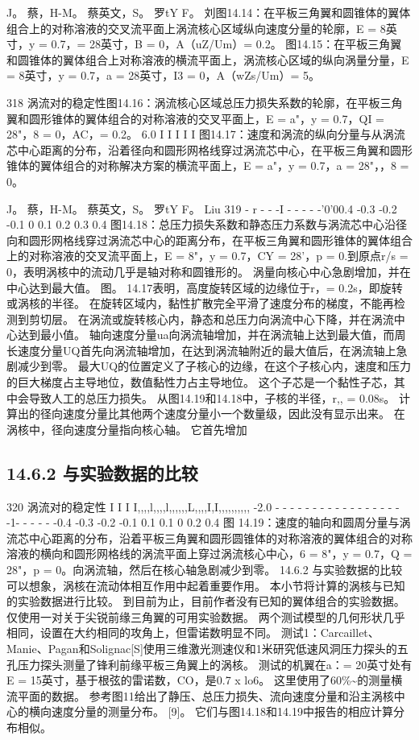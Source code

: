 \documentclass[UTF8,11pt,a4paper,openany,fontset=fandol]{ctexbook}
\begin{document}
J。 蔡，H-M。 蔡英文，S。 罗tY F。 刘图14.14：在平板三角翼和圆锥体的翼体组合上的对称溶液的交叉流平面上涡流核心区域纵向速度分量的轮廓，E = 8英寸，y = 0.7，= 28英寸，B = 0，A（uZ/Um）= 0.2。 图14.15：在平板三角翼和圆锥体的翼体组合上对称溶液的横流平面上，涡流核心区域的纵向涡量分量，E = 8英寸，y = 0.7，a = 28英寸，I3 = 0，A（wZs/Um）= 5。

318 涡流对的稳定性图14.16：涡流核心区域总压力损失系数的轮廓，在平板三角翼和圆形锥体的翼体组合的对称溶液的交叉平面上，E = a"，y = 0.7，QI = 28"，8 = 0，AC，= 0.2。 6.0 I I I I I 图14.17：速度和涡流的纵向分量与从涡流芯中心距离的分布，沿着径向和圆形网格线穿过涡流芯中心，在平板三角翼和圆形锥体的翼体组合的对称解决方案的横流平面上，E = a"，y = 0.7，a = 28"，，8 = 0。

J。 蔡，H-M。 蔡英文，S。 罗tY F。 Liu 319 - r - - -I - - - - -'0'00.4 -0.3 -0.2 -0.1 0 0.1 0.2 0.3 0.4 图14.18：总压力损失系数和静态压力系数与涡流芯中心沿径向和圆形网格线穿过涡流芯中心的距离分布，在平板三角翼和圆形锥体的翼体组合上的对称溶液的交叉流平面上，E = 8"，y = 0.7，CY = 28'，p = 0.到原点r/s = 0，表明涡核中的流动几乎是轴对称和圆锥形的。 涡量向核心中心急剧增加，并在中心达到最大值。 图。 14.17表明，高度旋转区域的边缘位于r，= 0.2s，即旋转或涡核的半径。 在旋转区域内，黏性扩散完全平滑了速度分布的梯度，不能再检测到剪切层。 在涡流或旋转核心内，静态和总压力向涡流中心下降，并在涡流中心达到最小值。 轴向速度分量ua向涡流轴增加，并在涡流轴上达到最大值，而周长速度分量UQ首先向涡流轴增加，在达到涡流轴附近的最大值后，在涡流轴上急剧减少到零。 最大UQ的位置定义了子核心的边缘，在这个子核心内，速度和压力的巨大梯度占主导地位，数值黏性力占主导地位。 这个子芯是一个黏性子芯，其中会导致人工的总压力损失。 从图14.19和14.18中，子核的半径，r,, = 0.08s。 计算出的径向速度分量比其他两个速度分量小一个数量级，因此没有显示出来。 在涡核中，径向速度分量指向核心轴。 它首先增加

\subsection{14.6.2 与实验数据的比较}
320 涡流对的稳定性 I I I I,,,,l,,,,l,,,,,,L,,,,I,I,,,,,,,,,, -2.0 - - - - - - - - - - - - - - - - - -1- - - - - -0.4 -0.3 -0.2 -0.1 0.1 0.1 0 0.2 0.4 图 14.19：速度的轴向和圆周分量与涡流芯中心距离的分布，沿着平板三角翼和圆形圆锥体的对称溶液的翼体组合的对称溶液的横向和圆形网格线的涡流平面上穿过涡流核心中心，6 = 8"，y = 0.7，Q = 28"，p = 0。向涡流轴，然后在核心轴急剧减少到零。 14.6.2 与实验数据的比较 可以想象，涡核在流动体相互作用中起着重要作用。 本小节将计算的涡核与已知的实验数据进行比较。 到目前为止，目前作者没有已知的翼体组合的实验数据。 仅使用一对关于尖锐前缘三角翼的可用实验数据。 两个测试模型的几何形状几乎相同，设置在大约相同的攻角上，但雷诺数明显不同。 测试1：Carcaillet、Manie、Pagan和Solignac[S]使用三维激光测速仪和1米研究低速风洞压力探头的五孔压力探头测量了锋利前缘平板三角翼上的涡核。 测试的机翼在a：= 20英寸处有E = 15英寸，基于根弦的雷诺数，CO，是0.7 x lo6。 这里使用了60\%\textasciitilde{}的测量横流平面的数据。 参考图11给出了静压、总压力损失、流向速度分量和沿主涡核中心的横向速度分量的测量分布。 [9]。 它们与图14.18和14.19中报告的相应计算分布相似。
\end{document}
